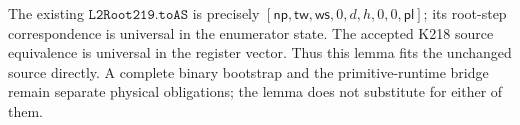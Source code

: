 The existing $\texttt{L2Root219.toAS}$ is precisely
$[\mathsf{np},\mathsf{tw},\mathsf{ws},0,d,h,0,0,\mathsf{pl}]$;
its root-step correspondence is universal in the enumerator state.
The accepted K218 source equivalence is universal in the register vector.
Thus this lemma fits the unchanged source directly. A complete binary
bootstrap and the primitive-runtime bridge remain separate physical
obligations; the lemma does not substitute for either of them.
